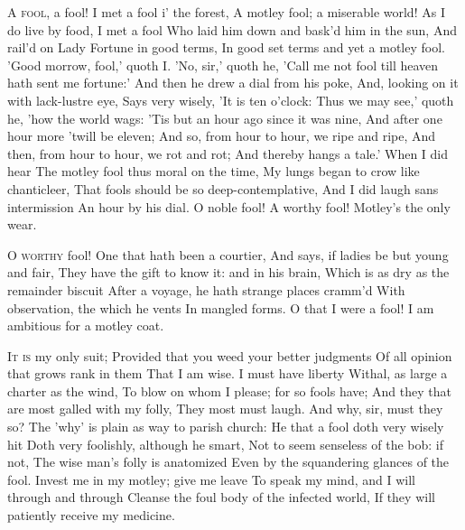 \documentclass[fontsize=9, a5paper]{scrbook}
\begin{document}
\begin{poem}
	\begin{stanza}
		\textsc{A fool}, a fool! I met a fool i' the forest,\verseline
		A motley fool; a miserable world!\verseline
		As I do live by food, I met a fool\verseline
		Who laid him down and bask'd him in the sun,\verseline
		And rail'd on Lady Fortune in good terms,\verseline
		In good set terms and yet a motley fool.\verseline
		'Good morrow, fool,' quoth I. 'No, sir,' quoth he,\verseline
		'Call me not fool till heaven hath sent me fortune:'\verseline
		And then he drew a dial from his poke,\verseline
		And, looking on it with lack-lustre eye,\verseline
		Says very wisely, 'It is ten o'clock:\verseline
		Thus we may see,' quoth he, 'how the world wags:\verseline
		'Tis but an hour ago since it was nine,\verseline
		And after one hour more 'twill be eleven;\verseline
		And so, from hour to hour, we ripe and ripe,\verseline
		And then, from hour to hour, we rot and rot;\verseline
		And thereby hangs a tale.' When I did hear\verseline
		The motley fool thus moral on the time,\verseline
		My lungs began to crow like chanticleer,\verseline
		That fools should be so deep-contemplative,\verseline
		And I did laugh sans intermission\verseline
		An hour by his dial. O noble fool!\verseline
		A worthy fool! Motley's the only wear.
	\end{stanza}

	\pagebreak	

	\begin{stanza}
		\textsc{O worthy} fool! One that hath been a courtier,\verseline
		And says, if ladies be but young and fair,\verseline
		They have the gift to know it: and in his brain,\verseline
		Which is as dry as the remainder biscuit\verseline
		After a voyage, he hath strange places cramm'd\verseline
		With observation, the which he vents\verseline
		In mangled forms. O that I were a fool!\verseline
		I am ambitious for a motley coat.
	\end{stanza}
	
	\begin{stanza}
		\textsc{It is} my only suit;\verseline
		Provided that you weed your better judgments\verseline
		Of all opinion that grows rank in them\verseline
		That I am wise. I must have liberty\verseline
		Withal, as large a charter as the wind,\verseline
		To blow on whom I please; for so fools have;\verseline
		And they that are most galled with my folly,\verseline
		They most must laugh. And why, sir, must they so?\verseline
		The 'why' is plain as way to parish church:\verseline
		He that a fool doth very wisely hit\verseline
		Doth very foolishly, although he smart,\verseline
		Not to seem senseless of the bob: if not,\verseline
		The wise man's folly is anatomized\verseline
		Even by the squandering glances of the fool.\verseline
		Invest me in my motley; give me leave\verseline
		To speak my mind, and I will through and through\verseline
		Cleanse the foul body of the infected world,\verseline
		If they will patiently receive my medicine.
	\end{stanza}
\end{poem}
\end{document}
